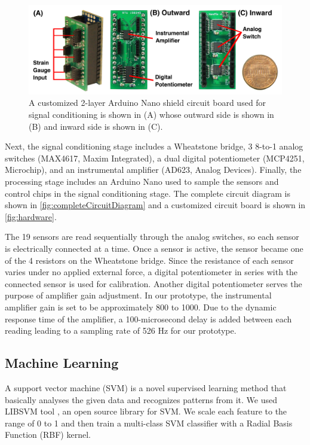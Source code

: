 \documentclass{sigchi}
\begin{document}
\begin{figure}[b]
  \begin{center}
  \includegraphics[width=1\columnwidth]{figures/harwareV2.jpg}
  \caption{ A customized 2-layer Arduino Nano shield circuit board used for signal conditioning is shown in (A) whose outward side is shown in (B) and inward side is shown in (C).}
  \label{fig:hardware}
  \end{center}
\end{figure}

Next, the signal conditioning stage includes a Wheatstone bridge, 3 8-to-1 analog switches (MAX4617, Maxim Integrated), a dual digital potentiometer (MCP4251, Microchip), and an instrumental amplifier (AD623, Analog Devices). Finally, the processing stage includes an Arduino Nano used to sample the sensors and control chips in the signal conditioning stage. The complete circuit diagram is shown in \autoref{fig:completeCircuitDiagram} and a customized circuit board is shown in \autoref{fig:hardware}.

The 19 sensors are read sequentially through the analog switches, so each sensor is electrically connected at a time. Once a sensor is active, the sensor became one of the 4 resistors on the Wheatstone bridge. Since the resistance of each sensor varies under no applied external force, a digital potentiometer in series with the connected sensor is used for calibration. Another digital potentiometer serves the purpose of amplifier gain adjustment. In our prototype, the instrumental amplifier gain is set to be approximately 800 to 1000. Due to the dynamic response time of the amplifier, a 100-microsecond delay is added between each reading leading to a sampling rate of 526 Hz for our prototype.


\subsection{Machine Learning}
A support vector machine (SVM) is a novel supervised learning method that basically analyses the given data and recognizes patterns from it.
We used LIBSVM tool \cite{CC01a}, an open source library for SVM. 
We scale each feature to the range of 0 to 1 and then train a multi-class SVM classifier with a Radial Basis Function (RBF) kernel.
\end{document}
